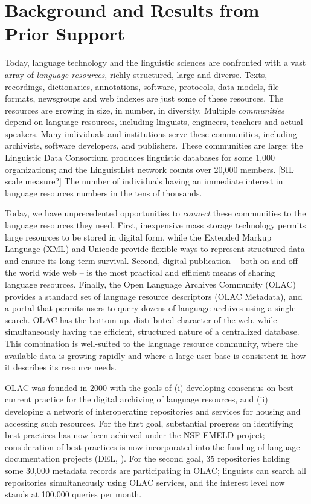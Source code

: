 \section{Background and Results from Prior Support}


Today, language technology and the linguistic sciences are confronted
with a vast array of \emph{language resources}, richly structured,
large and diverse.  Texts, recordings, dictionaries, annotations,
software, protocols, data models, file formats, newsgroups and web
indexes are just some of these resources.  The resources are growing
in size, in number, in diversity.  Multiple \emph{communities} depend
on language resources, including linguists, engineers, teachers and
actual speakers.  Many individuals and institutions serve these
communities, including archivists, software developers, and
publishers.  These communities are large:
the Linguistic Data Consortium produces linguistic databases for some 1,000 organizations;
and the LinguistList network counts over 20,000 members.  [SIL scale measure?]
The number of individuals having an immediate interest in language
resources numbers in the tens of thousands.


Today, we have unprecedented opportunities to \emph{connect} these
communities to the language resources they need.  First, inexpensive
mass storage technology permits large resources to be stored in
digital form, while the Extended Markup Language (XML) and Unicode
provide flexible ways to represent structured data and ensure its
long-term survival.  Second, digital publication -- both on and off
the world wide web -- is the most practical and efficient means of
sharing language resources.  Finally, the Open Language Archives
Community (OLAC) provides a standard set of language resource
descriptors (OLAC Metadata), and a portal that permits users to query
dozens of language archives using a single search.  OLAC has the
bottom-up, distributed character of the web, while simultaneously
having the efficient, structured nature of a centralized database.
This combination is well-suited to the language resource community,
where the available data is growing rapidly and where a large
user-base is consistent in how it describes its resource needs.


OLAC was founded in 2000 with the goals of (i) developing consensus on
best current practice for the digital archiving of language resources,
and (ii) developing a network of interoperating repositories and
services for housing and accessing such resources.  For the first
goal, substantial progress on identifying best practices has now been
achieved under the NSF EMELD project; consideration of best practices
is now incorporated into the funding of language documentation
projects (DEL, \citet{BirdSimons03language}).  For the second goal,
35 repositories holding some 30,000 metadata records are
participating in OLAC; linguists can search all repositories
simultaneously using OLAC services, and the interest level now stands
at 100,000 queries per month.

